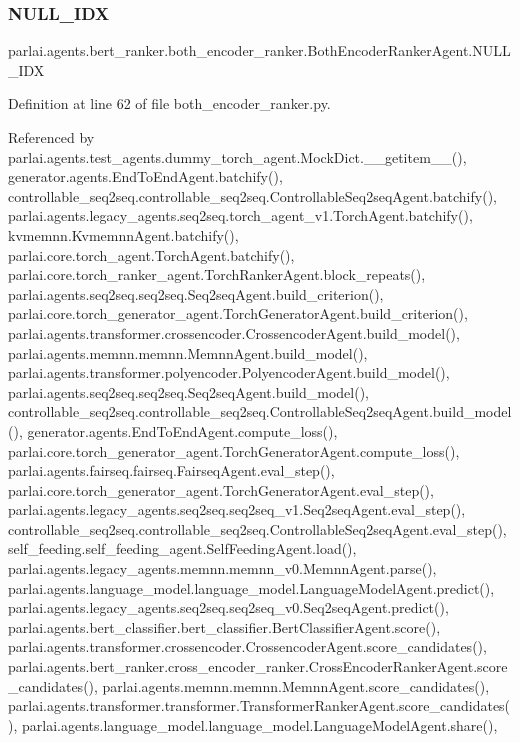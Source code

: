 \subsubsection{\texorpdfstring{N\+U\+L\+L\+\_\+\+I\+DX}{NULL\_IDX}}
{\footnotesize\ttfamily parlai.\+agents.\+bert\+\_\+ranker.\+both\+\_\+encoder\+\_\+ranker.\+Both\+Encoder\+Ranker\+Agent.\+N\+U\+L\+L\+\_\+\+I\+DX}



Definition at line 62 of file both\+\_\+encoder\+\_\+ranker.\+py.



Referenced by parlai.\+agents.\+test\+\_\+agents.\+dummy\+\_\+torch\+\_\+agent.\+Mock\+Dict.\+\_\+\+\_\+getitem\+\_\+\+\_\+(), generator.\+agents.\+End\+To\+End\+Agent.\+batchify(), controllable\+\_\+seq2seq.\+controllable\+\_\+seq2seq.\+Controllable\+Seq2seq\+Agent.\+batchify(), parlai.\+agents.\+legacy\+\_\+agents.\+seq2seq.\+torch\+\_\+agent\+\_\+v1.\+Torch\+Agent.\+batchify(), kvmemnn.\+Kvmemnn\+Agent.\+batchify(), parlai.\+core.\+torch\+\_\+agent.\+Torch\+Agent.\+batchify(), parlai.\+core.\+torch\+\_\+ranker\+\_\+agent.\+Torch\+Ranker\+Agent.\+block\+\_\+repeats(), parlai.\+agents.\+seq2seq.\+seq2seq.\+Seq2seq\+Agent.\+build\+\_\+criterion(), parlai.\+core.\+torch\+\_\+generator\+\_\+agent.\+Torch\+Generator\+Agent.\+build\+\_\+criterion(), parlai.\+agents.\+transformer.\+crossencoder.\+Crossencoder\+Agent.\+build\+\_\+model(), parlai.\+agents.\+memnn.\+memnn.\+Memnn\+Agent.\+build\+\_\+model(), parlai.\+agents.\+transformer.\+polyencoder.\+Polyencoder\+Agent.\+build\+\_\+model(), parlai.\+agents.\+seq2seq.\+seq2seq.\+Seq2seq\+Agent.\+build\+\_\+model(), controllable\+\_\+seq2seq.\+controllable\+\_\+seq2seq.\+Controllable\+Seq2seq\+Agent.\+build\+\_\+model(), generator.\+agents.\+End\+To\+End\+Agent.\+compute\+\_\+loss(), parlai.\+core.\+torch\+\_\+generator\+\_\+agent.\+Torch\+Generator\+Agent.\+compute\+\_\+loss(), parlai.\+agents.\+fairseq.\+fairseq.\+Fairseq\+Agent.\+eval\+\_\+step(), parlai.\+core.\+torch\+\_\+generator\+\_\+agent.\+Torch\+Generator\+Agent.\+eval\+\_\+step(), parlai.\+agents.\+legacy\+\_\+agents.\+seq2seq.\+seq2seq\+\_\+v1.\+Seq2seq\+Agent.\+eval\+\_\+step(), controllable\+\_\+seq2seq.\+controllable\+\_\+seq2seq.\+Controllable\+Seq2seq\+Agent.\+eval\+\_\+step(), self\+\_\+feeding.\+self\+\_\+feeding\+\_\+agent.\+Self\+Feeding\+Agent.\+load(), parlai.\+agents.\+legacy\+\_\+agents.\+memnn.\+memnn\+\_\+v0.\+Memnn\+Agent.\+parse(), parlai.\+agents.\+language\+\_\+model.\+language\+\_\+model.\+Language\+Model\+Agent.\+predict(), parlai.\+agents.\+legacy\+\_\+agents.\+seq2seq.\+seq2seq\+\_\+v0.\+Seq2seq\+Agent.\+predict(), parlai.\+agents.\+bert\+\_\+classifier.\+bert\+\_\+classifier.\+Bert\+Classifier\+Agent.\+score(), parlai.\+agents.\+transformer.\+crossencoder.\+Crossencoder\+Agent.\+score\+\_\+candidates(), parlai.\+agents.\+bert\+\_\+ranker.\+cross\+\_\+encoder\+\_\+ranker.\+Cross\+Encoder\+Ranker\+Agent.\+score\+\_\+candidates(), parlai.\+agents.\+memnn.\+memnn.\+Memnn\+Agent.\+score\+\_\+candidates(), parlai.\+agents.\+transformer.\+transformer.\+Transformer\+Ranker\+Agent.\+score\+\_\+candidates(), parlai.\+agents.\+language\+\_\+model.\+language\+\_\+model.\+Language\+Model\+Agent.\+share(), 